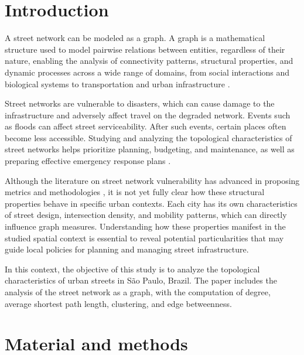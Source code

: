 \documentclass{pssbmac}
\begin{document}
\section{Introduction}

A street network can be modeled as a graph. A graph is a mathematical structure used to model pairwise relations between entities, regardless of their nature, enabling the analysis of connectivity patterns, structural properties, and dynamic processes across a wide range of domains, from social interactions and biological systems to transportation and urban infrastructure \cite{Newman2010}.

Street networks are vulnerable to disasters, which can cause damage to the infrastructure and adversely affect travel on the degraded network. Events such as floods can affect street serviceability. After such events, certain places often become less accessible. Studying and analyzing the topological characteristics of street networks helps prioritize planning, budgeting, and maintenance, as well as preparing effective emergency response plans \cite{balijepalliMeasuringVulnerabilityRoad2014}.

Although the literature on street network vulnerability has advanced in proposing metrics and methodologies \cite{morelliMeasuringUrbanRoad2021, santosVulnerabilityAnalysisComplex2023}, it is not yet fully clear how these structural properties behave in specific urban contexts. Each city has its own characteristics of street design, intersection density, and mobility patterns, which can directly influence graph measures. Understanding how these properties manifest in the studied spatial context is essential to reveal potential particularities that may guide local policies for planning and managing street infrastructure.

In this context, the objective of this study is to analyze the topological characteristics of urban streets in São Paulo, Brazil. The paper includes the analysis of the street network as a graph, with the computation of degree, average shortest path length, clustering, and edge betweenness.


\section{Material and methods}
\end{document}
